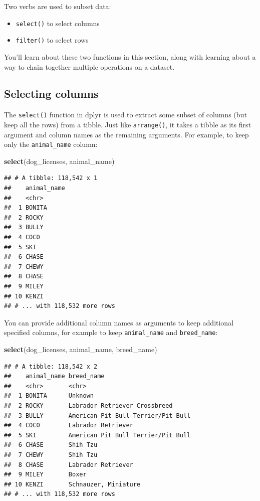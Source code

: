 \documentclass[]{Nemilov}
\newenvironment{Shaded}{\begin{snugshade}}{\end{snugshade}}
\newcommand{\KeywordTok}[1]{\textcolor[rgb]{0.13,0.29,0.53}{\textbf{#1}}}
\newcommand{\NormalTok}[1]{#1}
\providecommand{\tightlist}{%
  \setlength{\itemsep}{0pt}\setlength{\parskip}{0pt}}
\begin{document}
Two verbs are used to subset data:

\begin{itemize}
\tightlist
\item
  \texttt{select()} to select columns
\item
  \texttt{filter()} to select rows
\end{itemize}

You'll learn about these two functions in this section, along with learning about a way to chain together multiple operations on a dataset.

\hypertarget{selecting-columns}{%
\subsection{Selecting columns}\label{selecting-columns}}

The \texttt{select()} function in dplyr is used to extract some subset of columns (but keep all the rows) from a tibble. Just like \texttt{arrange()}, it takes a tibble as its first argument and column names as the remaining arguments. For example, to keep only the \texttt{animal\_name} column:

\begin{Shaded}
\begin{Highlighting}[]
\KeywordTok{select}\NormalTok{(dog_licenses, animal_name)}
\end{Highlighting}
\end{Shaded}

\begin{verbatim}
## # A tibble: 118,542 x 1
##    animal_name
##    <chr>      
##  1 BONITA     
##  2 ROCKY      
##  3 BULLY      
##  4 COCO       
##  5 SKI        
##  6 CHASE      
##  7 CHEWY      
##  8 CHASE      
##  9 MILEY      
## 10 KENZI      
## # ... with 118,532 more rows
\end{verbatim}

You can provide additional column names as arguments to keep additional specified columns, for example to keep \texttt{animal\_name} and \texttt{breed\_name}:

\begin{Shaded}
\begin{Highlighting}[]
\KeywordTok{select}\NormalTok{(dog_licenses, animal_name, breed_name)}
\end{Highlighting}
\end{Shaded}

\begin{verbatim}
## # A tibble: 118,542 x 2
##    animal_name breed_name                        
##    <chr>       <chr>                             
##  1 BONITA      Unknown                           
##  2 ROCKY       Labrador Retriever Crossbreed     
##  3 BULLY       American Pit Bull Terrier/Pit Bull
##  4 COCO        Labrador Retriever                
##  5 SKI         American Pit Bull Terrier/Pit Bull
##  6 CHASE       Shih Tzu                          
##  7 CHEWY       Shih Tzu                          
##  8 CHASE       Labrador Retriever                
##  9 MILEY       Boxer                             
## 10 KENZI       Schnauzer, Miniature              
## # ... with 118,532 more rows
\end{verbatim}
\end{document}
